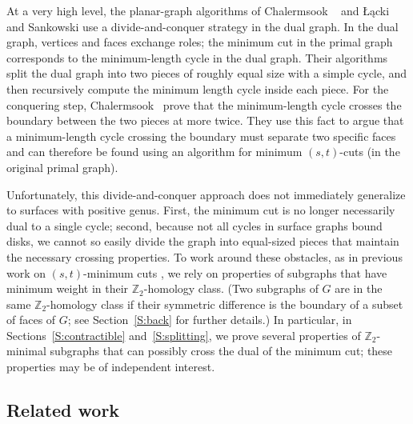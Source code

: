 \documentclass[twoside,leqno,twocolumn]{article}
\def\Z{\mathbb{Z}}
\begin{document}
At a very high level, the planar-graph algorithms of Chalermsook \etal\ \cite{cfn-dnlta-04} and Łącki and Sankowski use a divide-and-conquer strategy in the dual graph.  In the dual graph, vertices and faces exchange roles; the minimum cut in the primal graph corresponds to the minimum-length cycle in the dual graph.  Their algorithms split the dual graph into two pieces of roughly equal size with a simple cycle, and then recursively compute the minimum length cycle inside each piece.  For the conquering step, Chalermsook \etal\ prove that the minimum-length cycle crosses the boundary between the two pieces at more twice.  They use this fact to argue that a minimum-length cycle crossing the boundary must separate two specific faces and can therefore be found using an algorithm for minimum $(s,t)$-cuts (in the original primal graph).

Unfortunately, this divide-and-conquer approach does not immediately generalize to surfaces with positive genus.  First, the minimum cut is no longer necessarily dual to a single cycle; second, because not all cycles in surface graphs bound disks, we cannot so easily divide the graph into equal-sized pieces that maintain the necessary crossing properties.  To work around these obstacles, as in previous work on $(s,t)$-minimum cuts \cite{cen-mcshc-09, en-mcsnc-11}, we rely on properties of  subgraphs that have minimum weight in their $\Z_2$-homology class.  (Two subgraphs of $G$ are in the same $\Z_2$-homology class if their symmetric difference is the boundary of a subset of faces of $G$; see Section~\ref{S:back} for further details.)  In particular, in Sections~\ref{S:contractible} and~\ref{S:splitting}, we prove several properties of $\Z_2$-minimal subgraphs that can possibly cross the dual of the minimum cut; these properties may be of independent interest.

\subsection{Related work}
\end{document}
